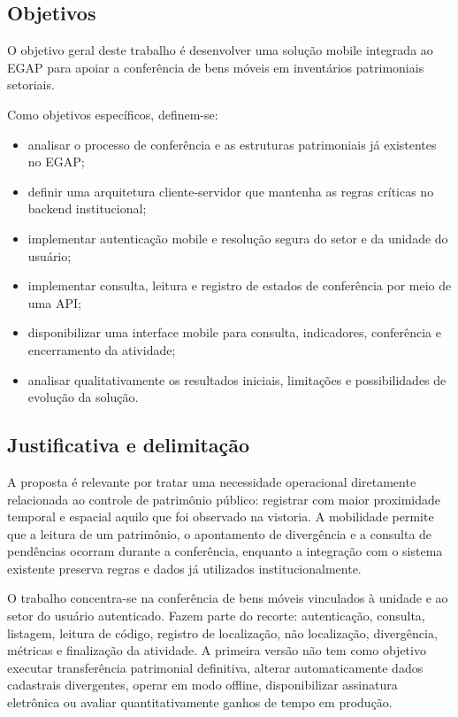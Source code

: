 \documentclass[12pt,a4paper]{article}
\begin{document}
\subsection{Objetivos}

O objetivo geral deste trabalho é desenvolver uma solução mobile integrada ao
EGAP para apoiar a conferência de bens móveis em inventários patrimoniais
setoriais.

Como objetivos específicos, definem-se:

\begin{itemize}
  \item analisar o processo de conferência e as estruturas patrimoniais já
  existentes no EGAP;
  \item definir uma arquitetura cliente-servidor que mantenha as regras
  críticas no backend institucional;
  \item implementar autenticação mobile e resolução segura do setor e da
  unidade do usuário;
  \item implementar consulta, leitura e registro de estados de conferência por
  meio de uma API;
  \item disponibilizar uma interface mobile para consulta, indicadores,
  conferência e encerramento da atividade;
  \item analisar qualitativamente os resultados iniciais, limitações e
  possibilidades de evolução da solução.
\end{itemize}

\subsection{Justificativa e delimitação}

A proposta é relevante por tratar uma necessidade operacional diretamente
relacionada ao controle de patrimônio público: registrar com maior proximidade
temporal e espacial aquilo que foi observado na vistoria. A mobilidade permite
que a leitura de um patrimônio, o apontamento de divergência e a consulta de
pendências ocorram durante a conferência, enquanto a integração com o sistema
existente preserva regras e dados já utilizados institucionalmente.

O trabalho concentra-se na conferência de bens móveis vinculados à unidade e ao
setor do usuário autenticado. Fazem parte do recorte: autenticação, consulta,
listagem, leitura de código, registro de localização, não localização,
divergência, métricas e finalização da atividade. A primeira versão não tem
como objetivo executar transferência patrimonial definitiva, alterar
automaticamente dados cadastrais divergentes, operar em modo offline,
disponibilizar assinatura eletrônica ou avaliar quantitativamente ganhos de
tempo em produção.
\end{document}
